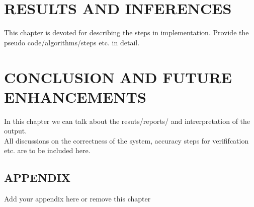\documentclass[MTech]{ugthesis}
\begin{document}
\chapter{RESULTS AND INFERENCES}
This chapter is devoted for describing the steps in implementation. Provide the pseudo code/algorithms/steps etc. in detail.
\chapter{CONCLUSION AND FUTURE ENHANCEMENTS}
In this chapter we can talk about the resuts/reports/ and intrerpretation of the output.\\
All discussions on the correctness of the system, accuracy steps for verififcation etc. are to be included here.

\begin{singlespace}
\end{singlespace}
\appendix

\begin{appendices}
\chapter*{APPENDIX}
Add your appendix here or remove this chapter
\end{appendices}
  
\end{document}
